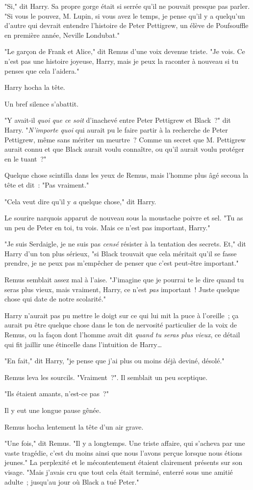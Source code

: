 "Si," dit Harry. Sa propre gorge était si serrée qu'il ne pouvait presque pas parler. "Si vous le pouvez, M. Lupin, si vous avez le temps, je pense qu'il y a quelqu'un d'autre qui devrait entendre l'histoire de Peter Pettigrew, un élève de Poufsouffle en première année, Neville Londubat."

"Le garçon de Frank et Alice," dit Remus d'une voix devenue triste. "Je vois. Ce n'est pas une histoire joyeuse, Harry, mais je peux la raconter à nouveau si tu penses que cela l'aidera."

Harry hocha la tête.

Un bref silence s'abattit.

"Y avait-il \emph{quoi que ce soit} d'inachevé entre Peter Pettigrew et Black~?" dit Harry. "\emph{N'importe quoi} qui aurait pu le faire partir à la recherche de Peter Pettigrew, même sans mériter un meurtre~? Comme un secret que M. Pettigrew aurait connu et que Black aurait voulu connaître, ou qu'il aurait voulu protéger en le tuant~?"

Quelque chose scintilla dans les yeux de Remus, mais l'homme plus âgé secoua la tête et dit~: "Pas vraiment."

"Cela veut dire qu'il y \emph{a} quelque chose," dit Harry.

Le sourire narquois apparut de nouveau sous la moustache poivre et sel. "Tu as un peu de Peter en toi, tu vois. Mais ce n'est pas important, Harry."

"Je suis Serdaigle, je ne suis pas \emph{censé} résister à la tentation des secrets. Et," dit Harry d'un ton plus sérieux, "si Black trouvait que cela méritait qu'il se fasse prendre, je ne peux pas m'empêcher de penser que c'est peut-être important."

Remus semblait assez mal à l'aise. "J'imagine que je pourrai te le dire quand tu seras plus vieux, mais vraiment, Harry, ce n'est \emph{pas} important~! Juste quelque chose qui date de notre scolarité."

Harry n'aurait pas pu mettre le doigt sur ce qui lui mit la puce à l'oreille~; ça aurait pu être quelque chose dans le ton de nervosité particulier de la voix de Remus, ou la façon dont l'homme avait dit \emph{quand tu seras plus vieux}, ce détail qui fit jaillir une étincelle dans l'intuition de Harry…

"En fait," dit Harry, "je pense que j'ai plus ou moins déjà deviné, désolé."

Remus leva les sourcils. "Vraiment~?". Il semblait un peu sceptique.

"Ils étaient amants, n'est-ce pas~?"

Il y eut une longue pause gênée.

Remus hocha lentement la tête d'un air grave.

"Une fois," dit Remus. "Il y a longtemps. Une triste affaire, qui s'acheva par une vaste tragédie, c'est du moins ainsi que nous l'avons perçue lorsque nous étions jeunes." La perplexité et le mécontentement étaient clairement présents sur son visage. "Mais j'avais cru que tout cela était terminé, enterré sous une amitié adulte~; jusqu'au jour où Black a tué Peter." 

